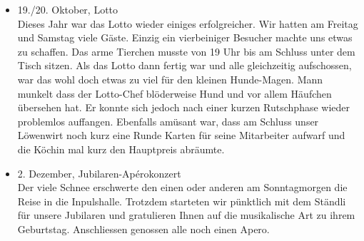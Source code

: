 \begin{history}
\begin{itemize}
            \item 19./20. Oktober, Lotto\\
                  Dieses Jahr war das Lotto wieder einiges erfolgreicher. Wir hatten am
                  Freitag und Samstag viele Gäste. Einzig ein vierbeiniger Besucher machte
                  uns etwas zu schaffen. Das arme Tierchen musste von 19 Uhr bis am
                  Schluss unter dem Tisch sitzen. Als das Lotto dann fertig war und alle
                  gleichzeitig aufschossen, war das wohl doch etwas zu viel für den
                  kleinen Hunde-Magen. Mann munkelt dass der Lotto-Chef blöderweise Hund
                  und vor allem Häufchen übersehen hat. Er konnte sich jedoch nach einer
                  kurzen Rutschphase wieder problemlos auffangen. Ebenfalls amüsant war,
                  dass am Schluss unser Löwenwirt noch kurz eine Runde Karten für seine
                  Mitarbeiter aufwarf und die Köchin mal kurz den Hauptpreis abräumte.

            \item 2. Dezember, Jubilaren-Apérokonzert\\
                  Der viele Schnee erschwerte den einen oder anderen am Sonntagmorgen die
                  Reise in die Inpulshalle. Trotzdem starteten wir pünktlich mit dem
                  Ständli für unsere Jubilaren und gratulieren Ihnen auf die musikalische
                  Art zu ihrem Geburtstag. Anschliessen genossen alle noch einen Apero.

      \end{itemize}

\end{history}
